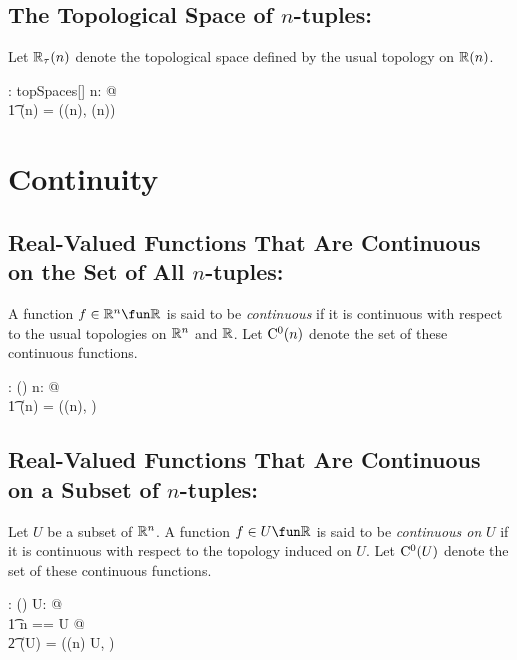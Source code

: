 \documentclass[11pt, oneside]{article}
\begin{document}
\subsection{The Topological Space of $n$-tuples: }

Let $\mathbb{R}_\tau(n)$ denote the topological space defined by the usual topology on $\operatorname{\mathbb{R}}(n)$.

\begin{axdef}
	\tsRtup: \nat \fun topSpaces[\Rinf]
\where
	\forall n: \nat @ \\
	\t1	\tsRtup(n) = (\Rtup(n), \tauRtup(n))
\end{axdef}

\section{Continuity}

\subsection{Real-Valued Functions That Are Continuous on the Set of All $n$-tuples: }

A function $f \in \R^n \fun \R$ is said to be \textit{continuous} if it is continuous with respect to the usual topologies
on $\mathbb{R}^n$ and $\mathbb{R}$.
Let $\operatorname{C^0}(n)$ denote the set of these continuous functions.

\begin{axdef}
	\CzeroRtup: \nat \fun \power(\Rinf \pfun \R)
\where
	\forall n: \nat @ \\
	\t1	\CzeroRtup(n) = \CzeroTT(\tsRtup(n), \Rtau)
\end{axdef}

\subsection{Real-Valued Functions That Are Continuous on a Subset of $n$-tuples: }

Let $U$ be a subset of $\mathbb{R}^n$.
A function $f \in U \fun \R$ is said to be \textit{continuous on} $U$
if it is continuous with respect to the topology induced on $U$.
Let $\operatorname{C^0}(U)$ denote the set of these continuous functions.

\begin{axdef}
	\CzeroSubsetRtup: \DeltaRinf \fun \power(\Rinf \pfun \R)
\where
	\forall U: \DeltaRinf @ \\
	\t1	\LET n == \dimRinf U @ \\
	\t2		\CzeroSubsetRtup(U) = \CzeroTT(\tsRtup(n) \inducedTopSp U, \Rtau)
\end{axdef}
\end{document}
